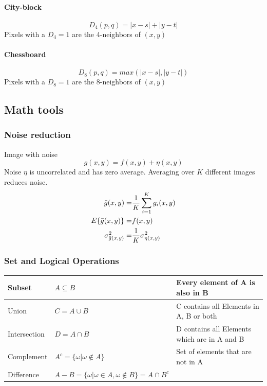 \paragraph{City-block}
\begin{equation}
D_4(p,q) = |x-s| + |y-t|
\end{equation}
Pixels with a $D_4 = 1$ are the 4-neighbors of $(x,y)$
\paragraph{Chessboard}
\begin{equation}
D_8(p,q) = max(|x-s|, |y-t|)
\end{equation}
Pixels with a $D_8 = 1$ are the 8-neighbors of $(x,y)$

\subsection{Math tools }
\subsubsection{Noise reduction }
Image with noise
\begin{equation}
g(x,y) = f(x,y) + \eta(x,y)
\end{equation}
Noise $\eta$ is uncorrelated and has zero average.  Averaging over $K$ different images reduces noise.
\begin{eqnarray}
\bar{g}(x,y)      =& \frac{1}{K} \sum\limits_{i=1}^{K}g_i(x,y) \notag \\
E\{\bar{g}(x,y)\}   =& f(x,y) \\
\sigma_{\bar{g}(x,y)}^2 =& \frac{1}{K} \sigma_{\eta(x,y)}^2 \notag
\end{eqnarray}

\subsubsection{Set and Logical Operations }
\begin{tabular}{|l|l|l|}
  \hline
  Subset			& $A \subseteq B$						& Every element of A is also in B
  \\ \hline
  Union			& $C = A \cup B$						& C contains all Elements in A, B or both
  \\ \hline
  Intersection	& $D = A \cap B$						& D contains all Elements which are in A and B
  \\ \hline
  Complement		& $A^c = \{ \omega | \omega \notin A\}$	& Set of elements that are not in A
  \\ \hline
  Difference		& $A-B = \{ \omega | \omega \in A, \omega \notin B\} = A \cap B^c$	&
  \\ \hline
\end{tabular}


